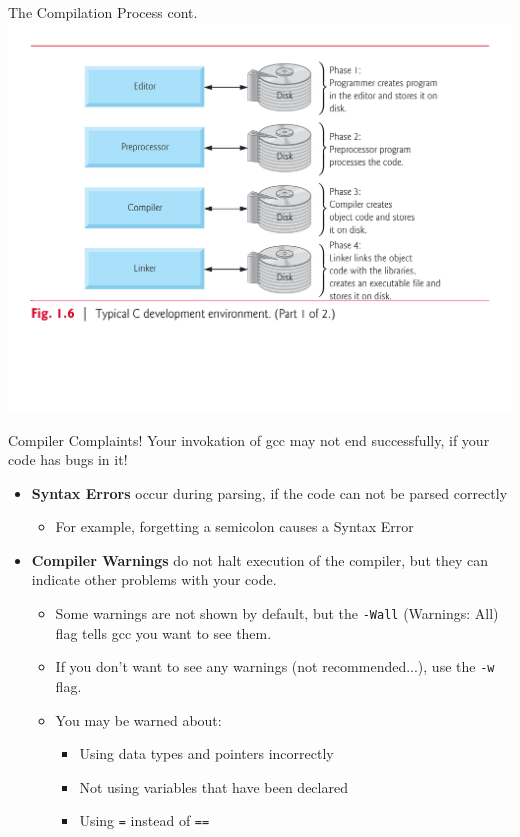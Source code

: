 \documentclass[11pt]{beamer}
\begin{document}
\begin{frame}{The Compilation Process cont.}
\center
\includegraphics[scale=0.35]{compile.png}
\end{frame}

\begin{frame}{Compiler Complaints!}
Your invokation of gcc may not end successfully, if your code has bugs in it! 
\begin{itemize}
\item \textbf{Syntax Errors} occur during parsing, if the code can not be parsed correctly
	\begin{itemize}
	\item For example, forgetting a semicolon causes a Syntax Error
	\end{itemize}
\item \textbf{Compiler Warnings} do not halt execution of the compiler, but they can indicate other problems with your code.  
	\begin{itemize}
	\item Some warnings are not shown by default, but the \texttt{-Wall} (Warnings: All) flag tells gcc you want to see them.
	\item If you don't want to see any warnings (not recommended...), use the \texttt{-w} flag.
	\item You may be warned about:
		\begin{itemize}
			\item Using data types and pointers incorrectly
			\item Not using variables that have been declared
			\item Using \texttt{=} instead of \texttt{==}
		\end{itemize}
	\end{itemize}
\end{itemize}
\end{frame}
\end{document}
